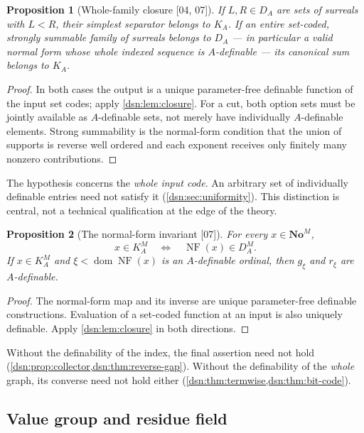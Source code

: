 \documentclass[11pt,a4paper]{article}
\numberwithin{equation}{section}
\newtheorem{proposition}[proposition]{Proposition}
\theoremstyle{definition}
\theoremstyle{remark}
\newcommand{\No}{\mathbf{No}}
\newcommand{\NF}{\operatorname{NF}}
\newcommand{\dom}{\operatorname{dom}}
\newcommand{\src}[1]{\textup{\textsf{\small[#1]}}}
\begin{document}
\begin{proposition}[Whole-family closure \src{04, 07}]\label{dsn:prop:uniform}
If $L,R\in D_A$ are sets of surreals with $L<R$, their simplest separator
belongs to $K_A$. If an entire set-coded, strongly summable family of
surreals belongs to $D_A$ --- in particular a valid normal form whose
\emph{whole indexed sequence} is $A$-definable --- its canonical sum
belongs to $K_A$.
\end{proposition}
\begin{proof}
In both cases the output is a unique parameter-free definable function of
the input set codes; apply \cref{dsn:lem:closure}. For a cut, both option
sets must be jointly available as $A$-definable sets, not merely have
individually $A$-definable elements. Strong summability is the
normal-form condition that the union of supports is reverse well ordered
and each exponent receives only finitely many nonzero contributions.
\end{proof}

The hypothesis concerns the \emph{whole input code}. An arbitrary set of
individually definable entries need not satisfy it
(\cref{dsn:sec:uniformity}). This distinction is central, not a technical
qualification at the edge of the theory.

\begin{proposition}[The normal-form invariant \src{07}]\label{dsn:prop:nf-invariant}
For every $x\in\No^M$,
\[
 x\in K^M_A\quad\Longleftrightarrow\quad\NF(x)\in D^M_A.
\]
If $x\in K^M_A$ and $\xi<\dom\NF(x)$ is an $A$-definable ordinal, then
$g_\xi$ and $r_\xi$ are $A$-definable.
\end{proposition}
\begin{proof}
The normal-form map and its inverse are unique parameter-free definable
constructions. Evaluation of a set-coded function at an input is also
uniquely definable. Apply \cref{dsn:lem:closure} in both directions.
\end{proof}

Without the definability of the index, the final assertion need not hold
(\cref{dsn:prop:collector,dsn:thm:reverse-gap}). Without the definability
of the \emph{whole} graph, its converse need not hold either
(\cref{dsn:thm:termwise,dsn:thm:bit-code}).

\subsection{Value group and residue field}
\end{document}

